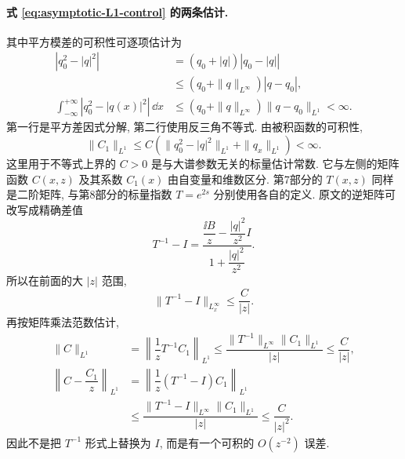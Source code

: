 \paragraph{式 \eqref{eq:asymptotic-L1-control} 的两条估计.}
其中平方模差的可积性可逐项估计为
\begin{align*}
\left|q_0^2-|q|^2\right|
&=(q_0+|q|)\left|q_0-|q|\right|\\
&\le(q_0+\|q\|_{L^\infty})|q-q_0|,\\
\int_{-\infty}^{+\infty}\left|q_0^2-|q(x)|^2\right|\,\dd x
&\le(q_0+\|q\|_{L^\infty})\|q-q_0\|_{L^1}<\infty.
\end{align*}
第一行是平方差因式分解, 第二行使用反三角不等式.
由被积函数的可积性,
\[
\| C_1\|_{L^1}
\le C\left(\|q_0^2-|q|^2\|_{L^1}+\|q_x\|_{L^1}\right)<\infty.
\]
这里用于不等式上界的 $C>0$ 是与大谱参数无关的标量估计常数. 它与左侧的矩阵函数 $C(x,z)$ 及其系数 $C_1(x)$ 由自变量和维数区分. 第7部分的 $T(x,z)$ 同样是二阶矩阵, 与第8部分的标量指数 $T=e^{2s}$ 分别使用各自的定义.
原文的逆矩阵可改写成精确差值
\[
 T^{-1}-I
=\dfrac{\dfrac{\ii B}{z}-\dfrac{|q|^2}{z^2}I}
{1+\dfrac{|q|^2}{z^2}}.
\]
所以在前面的大 $|z|$ 范围,
\[
\| T^{-1}-I\|_{L^\infty_x}\le\dfrac{C}{|z|}.
\]
再按矩阵乘法范数估计,
\begin{align*}
\| C\|_{L^1}
&=\left\|\dfrac{1}{z} T^{-1} C_1\right\|_{L^1}
\le\dfrac{\| T^{-1}\|_{L^\infty}\| C_1\|_{L^1}}{|z|}
\le\dfrac{C}{|z|},\\
\left\| C-\dfrac{ C_1}{z}\right\|_{L^1}
&=\left\|\dfrac{1}{z}( T^{-1}-I) C_1\right\|_{L^1}\\
&\le\dfrac{\| T^{-1}-I\|_{L^\infty}\| C_1\|_{L^1}}{|z|}
\le\dfrac{C}{|z|^2}.
\end{align*}
因此不是把 $ T^{-1}$ 形式上替换为 $I$,
而是有一个可积的 $O(z^{-2})$ 误差.

